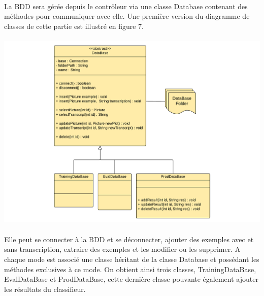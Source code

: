 \paragraph{}

La BDD sera gérée depuis le contrôleur via une classe Database contenant des méthodes pour communiquer avec elle. Une première version du diagramme de classes de cette partie est illustré en figure 7.

\paragraph{}

\begin{mdframed}[frametitle={Figure 8 : Diagramme de classes de l'interface avec la BDD}, innerbottommargin=10]
\begin{center}
\includegraphics[width=\linewidth]{bdd.pdf}
\end{center}
\end{mdframed}

\paragraph{}

Elle peut se connecter à la BDD et se déconnecter, ajouter des exemples avec et sans transcription, extraire des exemples et les modifier ou les supprimer. A chaque mode est associé une classe héritant de la classe Database et possédant les méthodes exclusives à ce mode. On obtient ainsi trois classes, TrainingDataBase, EvalDataBase et ProdDataBase, cette dernière classe pouvante également ajouter les résultats du classifieur.

